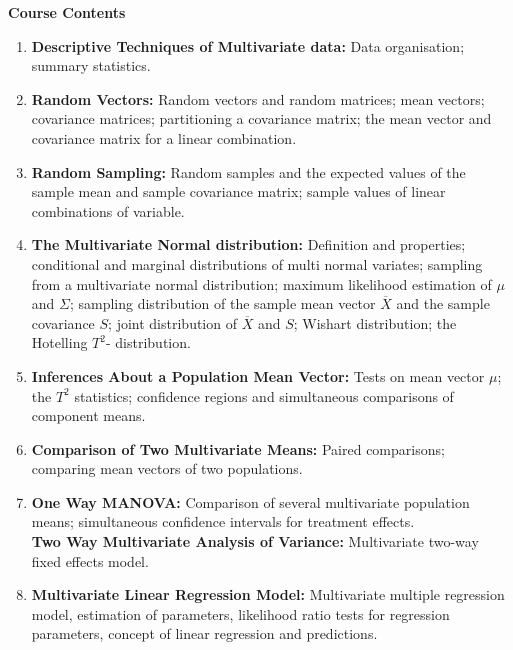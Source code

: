 \documentclass[11pt,a4paper]{article}
\theoremstyle{definition}
\begin{document}
\textbf{Course Contents}
\begin{enumerate}
\item[]  \textbf{Descriptive Techniques of Multivariate data:} Data organisation; summary statistics.
\item[] \textbf{Random Vectors:} Random vectors and random matrices; mean vectors; covariance matrices; partitioning a covariance matrix; the mean vector and covariance matrix for a  linear combination.
\item[] \textbf{Random Sampling:} Random samples and the expected values of the sample mean and sample covariance matrix; sample values of linear combinations of variable.
\item[] \textbf{The Multivariate Normal distribution:} Definition and properties; conditional and marginal distributions of multi normal variates; sampling from a multivariate normal distribution; maximum likelihood estimation of $\mu$ and $\Sigma$; sampling distribution of the sample mean vector $\overline{X}$ and the sample covariance $S$; joint distribution of $\overline{X}$ and $S$; Wishart distribution; the Hotelling $T^2$- distribution.
\item[] \textbf{Inferences About a Population Mean Vector:} Tests on mean vector $\mu$; the $T^2$ statistics; confidence regions and simultaneous comparisons of component means.
\item[] \textbf{Comparison of Two Multivariate Means:} Paired comparisons; comparing mean vectors of two populations.
\item[] \textbf{One Way MANOVA:} Comparison of several multivariate population means; simultaneous confidence intervals for treatment effects.\\
\textbf{Two Way Multivariate Analysis of Variance:} Multivariate two-way fixed effects model.
\item[] \textbf{Multivariate Linear Regression Model:} Multivariate multiple regression model, estimation of parameters, likelihood ratio tests for regression parameters, concept of linear regression and predictions.
\end{enumerate}
\end{document}
